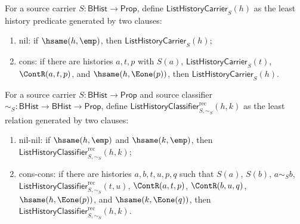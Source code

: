 \begin{definition}
\label{def:list-history-carrier}
For a source carrier $S:\mathsf{BHist}\to\mathsf{Prop}$, define $\mathsf{ListHistoryCarrier}_S(h)$ as the least history predicate generated by two clauses:
\begin{enumerate}
  \item nil: if $\hsame(h,\emp)$, then $\mathsf{ListHistoryCarrier}_S(h)$;
  \item cons: if there are histories $a,t,p$ with $S(a)$, $\mathsf{ListHistoryCarrier}_S(t)$, $\ContR(a,t,p)$, and $\hsame(h,\Eone(p))$, then $\mathsf{ListHistoryCarrier}_S(h)$.
\end{enumerate}
\end{definition}

\begin{definition}
\label{def:list-history-classifier}
For a source carrier $S:\mathsf{BHist}\to\mathsf{Prop}$ and source classifier
$\sim_S:\mathsf{BHist}\to\mathsf{BHist}\to\mathsf{Prop}$, define
$\mathsf{ListHistoryClassifier}^{\mathrm{rec}}_{S,\sim_S}(h,k)$ as the least relation
generated by two clauses:
\begin{enumerate}
  \item nil-nil: if $\hsame(h,\emp)$ and $\hsame(k,\emp)$, then
  $\mathsf{ListHistoryClassifier}^{\mathrm{rec}}_{S,\sim_S}(h,k)$;
  \item cons-cons: if there are histories $a,b,t,u,p,q$ such that $S(a)$,
  $S(b)$, $a\sim_S b$, $\mathsf{ListHistoryClassifier}^{\mathrm{rec}}_{S,\sim_S}(t,u)$,
  $\ContR(a,t,p)$, $\ContR(b,u,q)$, $\hsame(h,\Eone(p))$, and
  $\hsame(k,\Eone(q))$, then
  $\mathsf{ListHistoryClassifier}^{\mathrm{rec}}_{S,\sim_S}(h,k)$.
\end{enumerate}
\end{definition}

